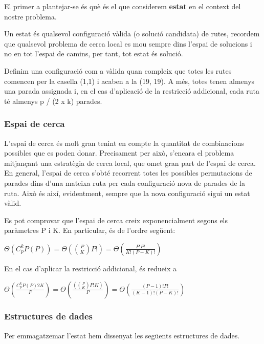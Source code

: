 
El primer a plantejar-se és què és el que considerem \textbf{estat} en el context del nostre problema. 

Un estat és qualsevol configuració vàlida (o solució candidata) de rutes, recordem que qualsevol problema de cerca local es mou sempre dins l'espai de solucions i no en tot l'espai de camins, per tant, tot estat és solució. 

Definim una configuració com a vàlida quan compleix que totes les rutes comencen per la casella (1,1) i acaben a la (19, 19). A més, totes tenen almenys una parada assignada i, en el cas d'aplicació de la restricció addicional, cada ruta té almenys p / (2 x k) parades.

\subsubsection{Espai de cerca}

L'espai de cerca és molt gran tenint en compte la quantitat de combinacions possibles que es poden donar. Precisament per això, s'encara el problema mitjançant una estratègia de cerca local, que omet gran part de l'espai de cerca. En general, l'espai de cerca s'obté recorrent totes les possibles permutacions de parades dins d'una mateixa ruta per cada configuració nova de parades de la ruta. Això és així, evidentment, sempre que la nova configuració sigui un estat vàlid. 

Es pot comprovar que l'espai de cerca creix exponencialment segons els paràmetres P i K. En particular, és de l'ordre següent:

\begin{center}
\Large{$\Theta(C_{p}^{k} P(P)) = \Theta({P \choose K} P!) = \Theta(\frac{P!P!}{K!(P-K)!}) $}
\end{center}


En el cas d'aplicar la restricció addicional, és redueix a 

\begin{center}
\Large{$\Theta(\frac{C_{p}^{k} P(P) 2K}{P}) = \Theta(\frac{({P \choose K} P!K)}{P}) = \Theta(\frac{(P-1)!P!}{(K-1)!(P-K)!})$ }
\end{center}

\subsubsection{Estructures de dades}	

Per emmagatzemar l'estat hem dissenyat les següents estructures de dades.

